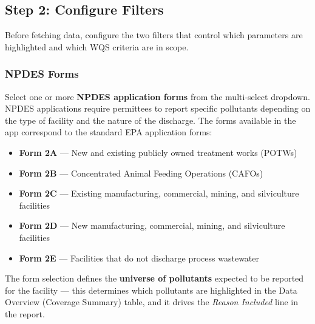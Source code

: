 \documentclass[
  11pt,
  letterpaper,
  DIV=11,
  numbers=noendperiod]{scrartcl}
\providecommand{\tightlist}{%
  \setlength{\itemsep}{0pt}\setlength{\parskip}{0pt}}
\begin{document}
\subsection{Step 2: Configure Filters}\label{sec-configure-filters}

Before fetching data, configure the two filters that control which
parameters are highlighted and which WQS criteria are in scope.

\subsubsection{NPDES Forms}\label{sec-npdes-forms}

Select one or more \textbf{NPDES application forms} from the
multi-select dropdown. NPDES applications require permittees to report
specific pollutants depending on the type of facility and the nature of
the discharge. The forms available in the app correspond to the standard
EPA application forms:

\begin{itemize}
\tightlist
\item
  \textbf{Form 2A} --- New and existing publicly owned treatment works
  (POTWs)
\item
  \textbf{Form 2B} --- Concentrated Animal Feeding Operations (CAFOs)
\item
  \textbf{Form 2C} --- Existing manufacturing, commercial, mining, and
  silviculture facilities
\item
  \textbf{Form 2D} --- New manufacturing, commercial, mining, and
  silviculture facilities
\item
  \textbf{Form 2E} --- Facilities that do not discharge process
  wastewater
\end{itemize}

The form selection defines the \textbf{universe of pollutants} expected
to be reported for the facility --- this determines which pollutants are
highlighted in the Data Overview (Coverage Summary) table, and it drives
the \emph{Reason Included} line in the report.
\end{document}
